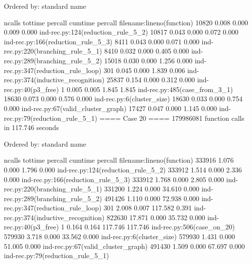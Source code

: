\documentclass[11pt]{article}
\begin{document}
                  Ordered by: standard name

                  ncalls  tottime  percall  cumtime  percall filename:lineno(function)
                   10820    0.008    0.000    0.009    0.000 ind-rec.py:124(reduction_rule_5_2)
                   10817    0.043    0.000    0.072    0.000 ind-rec.py:166(reduction_rule_5_3)
                    8411    0.043    0.000    0.071    0.000 ind-rec.py:220(branching_rule_5_1)
                    8410    0.032    0.000    0.405    0.000 ind-rec.py:289(branching_rule_5_2)
                   15018    0.030    0.000    1.256    0.000 ind-rec.py:347(reduction_rule_loop)
                     301    0.045    0.000    1.839    0.006 ind-rec.py:374(inductive_recognition)
                   25837    0.154    0.000    0.312    0.000 ind-rec.py:40(p3_free)
                       1    0.005    0.005    1.845    1.845 ind-rec.py:485(case_from_3_1)
                   18630    0.073    0.000    0.576    0.000 ind-rec.py:6(cluster_size)
                   18630    0.033    0.000    0.754    0.000 ind-rec.py:67(valid_cluster_graph)
                   17427    0.047    0.000    1.145    0.000 ind-rec.py:79(reduction_rule_5_1)
                   ==== Case 20 ====
                            179986081 function calls in 117.746 seconds

                      Ordered by: standard name

                      ncalls  tottime  percall  cumtime  percall filename:lineno(function)
                      333916    1.076    0.000    1.796    0.000 ind-rec.py:124(reduction_rule_5_2)
                      333912    1.514    0.000    2.336    0.000 ind-rec.py:166(reduction_rule_5_3)
                      333912    1.768    0.000    2.805    0.000 ind-rec.py:220(branching_rule_5_1)
                      331200    1.224    0.000   34.610    0.000 ind-rec.py:289(branching_rule_5_2)
                      491426    1.110    0.000   72.938    0.000 ind-rec.py:347(reduction_rule_loop)
                         301    2.008    0.007  117.582    0.391 ind-rec.py:374(inductive_recognition)
                      822630   17.871    0.000   35.732    0.000 ind-rec.py:40(p3_free)
                           1    0.164    0.164  117.746  117.746 ind-rec.py:506(case_on_20)
                      579930    3.718    0.000   33.562    0.000 ind-rec.py:6(cluster_size)
                      579930    1.431    0.000   51.005    0.000 ind-rec.py:67(valid_cluster_graph)
                      491430    1.509    0.000   67.697    0.000 ind-rec.py:79(reduction_rule_5_1)
\end{document}
